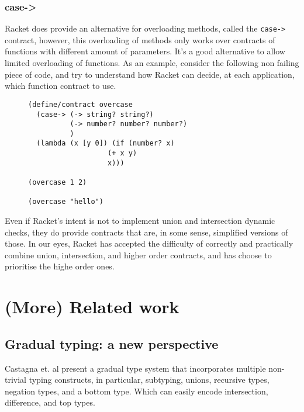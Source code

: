 \documentclass[sigplan,10pt,review,anonymous]{acmart}
\newcommand{\info}[2][1=]{}
\newcommand{\racket}[1]{\lstinline[language=racket]{#1}}
\begin{document}
\subsubsection{case->}

Racket does provide an alternative for overloading methods, called the
\racket{case->} contract, however, this overloading of methods only
works over contracts of functions with different amount of parameters.
It's a good alternative to allow limited overloading of functions.
As an example, consider the following non failing piece of code, and
try to understand how Racket can decide, at each application,
which function contract to use.

\begin{figure}[h]

\begin{lstlisting}[language=racket]
(define/contract overcase
  (case-> (-> string? string?)
          (-> number? number? number?)
          )
  (lambda (x [y 0]) (if (number? x)
                   (+ x y)
                   x)))

(overcase 1 2)

(overcase "hello")
\end{lstlisting}
\end{figure}

Even if Racket's intent is not to implement union and intersection
dynamic checks, they do provide contracts that are, in some sense,
simplified versions of those.
In our eyes, Racket has accepted the difficulty of correctly and practically
combine union, intersection, and higher order contracts, and has choose
to prioritise the highe order ones.



\section{(More) Related work}
\label{sec:related-work}
\info{Including a mention of statically typed systems with union}

\subsection{Gradual typing: a new perspective}

Castagna et. al \cite{gradualCastagna} present a gradual type system that
incorporates multiple non-trivial typing constructs, in particular, subtyping,
unions, recursive types, negation types, and a bottom type.
Which can easily encode intersection, difference, and top types.
\end{document}
